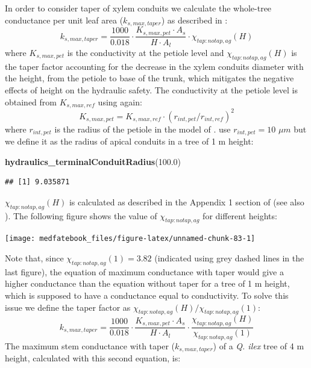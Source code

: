 \documentclass[]{book}
\newenvironment{Shaded}{\begin{snugshade}}{\end{snugshade}}
\newcommand{\KeywordTok}[1]{\textcolor[rgb]{0.13,0.29,0.53}{\textbf{#1}}}
\newcommand{\FloatTok}[1]{\textcolor[rgb]{0.00,0.00,0.81}{#1}}
\newcommand{\NormalTok}[1]{#1}
\begin{document}
In order to consider taper of xylem conduits we calculate the whole-tree conductance per unit leaf area (\(k_{s, max, taper}\)) as described in \citet{Christoffersen2016}:
\begin{equation}
k_{s, max, taper}=\frac{1000}{0.018} \cdot \frac{K_{s,max,pet}\cdot A_{s}}{H\cdot A_{l}}\cdot \chi_{tap:notap,ag}(H)
\end{equation}
where \(K_{s,max,pet}\) is the conductivity at the petiole level and \(\chi_{tap:notap,ag}(H)\) is the taper factor accounting for the decrease in the xylem conduits diameter with the height, from the petiole to base of the trunk, which mitigates the negative effects of height on the hydraulic safety. The conductivity at the petiole level is obtained from \(K_{s,max,ref}\) using again:
\begin{equation}
K_{s,max,pet} = K_{s,max,ref}\cdot (r_{int, pet}/r_{int,ref})^{2}
\end{equation}
where \(r_{int, pet}\) is the radius of the petiole in the model of \citet{Savage2010}. \citet{Christoffersen2016} use \(r_{int, pet} = 10\) \(\mu m\) but we define it as the radius of apical conduits in a tree of 1 m height:

\begin{Shaded}
\begin{Highlighting}[]
\KeywordTok{hydraulics_terminalConduitRadius}\NormalTok{(}\FloatTok{100.0}\NormalTok{)}
\end{Highlighting}
\end{Shaded}

\begin{verbatim}
## [1] 9.035871
\end{verbatim}

\(\chi_{tap:notap,ag}(H)\) is calculated as described in the Appendix 1 section of \citet{Christoffersen2016} (see also \citet{Savage2010}). The following figure shows the value of \(\chi_{tap:notap,ag}\) for different heights:

\begin{center}\texttt{[image: medfatebook\_files/figure-latex/unnamed-chunk-83-1]} \end{center}

Note that, since \(\chi_{tap:notap,ag}(1) = 3.82\) (indicated using grey dashed lines in the last figure), the equation of maximum conductance with taper would give a higher conductance than the equation without taper for a tree of 1 m height, which is supposed to have a conductance equal to conductivity. To solve this issue we define the taper factor as \(\chi_{tap:notap,ag}(H)/\chi_{tap:notap,ag}(1)\):
\begin{equation}
k_{s, max, taper}=\frac{1000}{0.018} \cdot \frac{K_{s,max,pet}\cdot A_{s}}{H\cdot A_{l}}\cdot \frac{\chi_{tap:notap,ag}(H)}{\chi_{tap:notap,ag}(1)}
\end{equation}
The maximum stem conductance with taper (\(k_{s, max, taper}\)) of a \emph{Q. ilex} tree of 4 m height, calculated with this second equation, is:
\end{document}

